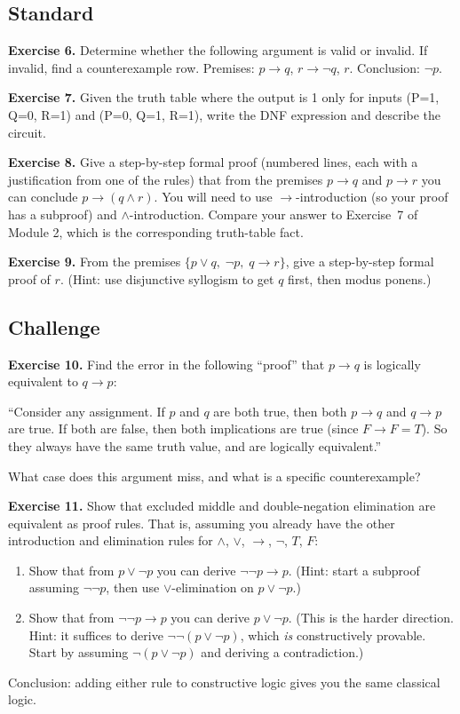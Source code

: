 \documentclass[11pt]{article}
\begin{document}
\subsection*{Standard}

\textbf{Exercise 6.}\label{ex:m3:6} Determine whether the following argument is valid or invalid. If invalid, find a counterexample row. Premises: $p \to q$, $r \to \lnot q$, $r$. Conclusion: $\lnot p$.

\bigskip
\textbf{Exercise 7.}\label{ex:m3:7} Given the truth table where the output is 1 only for inputs (P=1, Q=0, R=1) and (P=0, Q=1, R=1), write the DNF expression and describe the circuit.

\bigskip
\textbf{Exercise 8.}\label{ex:m3:8} Give a step-by-step formal proof (numbered lines, each with a justification from one of the rules) that from the premises $p \to q$ and $p \to r$ you can conclude $p \to (q \wedge r)$. You will need to use $\to$-introduction (so your proof has a subproof) and $\wedge$-introduction. Compare your answer to Exercise~7 of Module 2, which is the corresponding truth-table fact.

\bigskip
\textbf{Exercise 9.}\label{ex:m3:9} From the premises $\{p \vee q,\; \lnot p,\; q \to r\}$, give a step-by-step formal proof of $r$. (Hint: use disjunctive syllogism to get $q$ first, then modus ponens.)

\subsection*{Challenge}

\textbf{Exercise 10.}\label{ex:m3:10} Find the error in the following ``proof'' that $p \to q$ is logically equivalent to $q \to p$:

``Consider any assignment. If $p$ and $q$ are both true, then both $p \to q$ and $q \to p$ are true. If both are false, then both implications are true (since $F \to F = T$). So they always have the same truth value, and are logically equivalent.''

What case does this argument miss, and what is a specific counterexample?

\bigskip
\textbf{Exercise 11.}\label{ex:m3:11} Show that excluded middle and double-negation elimination are equivalent as proof rules. That is, assuming you already have the other introduction and elimination rules for $\wedge$, $\vee$, $\to$, $\lnot$, $T$, $F$:
\begin{enumerate}[label=(\alph*)]
  \item Show that from $p \vee \lnot p$ you can derive $\lnot\lnot p \to p$. (Hint: start a subproof assuming $\lnot\lnot p$, then use $\vee$-elimination on $p \vee \lnot p$.)
  \item Show that from $\lnot\lnot p \to p$ you can derive $p \vee \lnot p$. (This is the harder direction. Hint: it suffices to derive $\lnot\lnot(p \vee \lnot p)$, which \emph{is} constructively provable. Start by assuming $\lnot(p \vee \lnot p)$ and deriving a contradiction.)
\end{enumerate}
Conclusion: adding either rule to constructive logic gives you the same classical logic.
\end{document}
